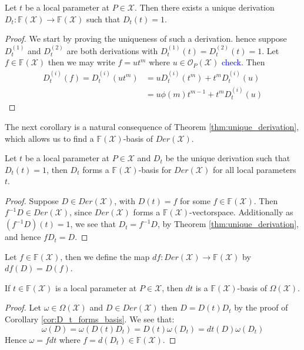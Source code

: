 \begin{theorem}\label{thm:unique_derivation}
  Let $t$ be a local parameter at $P \in \mathcal{X}$. Then there exists a unique derivation $D_t: \mathbb{F}(\mathcal{X}) \to \mathbb{F}(\mathcal{X})$ such that $D_t(t) = 1$.
\end{theorem}
\begin{proof}
  We start by proving the uniqueness of such a derivation. hence suppose $D_t^{(1)}$ and $D_t^{(2)}$ are both  derivations with $D_t^{(1)}(t) = D_t^{(2)}(t) = 1$. Let $f \in \mathbb{F}(\mathcal{X})$ then we may write $f = u t^m$ where $u \in \mathcal{O}_{P}(\mathcal{X})$ \textcolor{blue}{check}. Then
  \begin{align*}
    D_t^{(i)}(f) = D_t^{(i)}(u t^{m}) &= uD^{(i)}_t(t^m) + t^m D_t^{(i)}(u) \\
    &= u \phi(m) t^{m - 1} + t^m D_t^{(i)}(u)
  \end{align*}
\end{proof}

The next corollary is a natural consequence of Theorem \ref{thm:unique_derivation}, which allows us to find a $\mathbb{F}(\mathcal{X})$-basis of $Der(\mathcal{X})$.
\begin{corollary}\label{cor:D_t_forms_basis}
  Let $t$ be a local parameter at $P \in \mathcal{X}$ and $D_t$ be the unique derivation such that $D_t(t) = 1$, then $D_t$ forms a $\mathbb{F}(\mathcal{X})$-basis for $Der(\mathcal{X})$ for all local parameters $t$.
\end{corollary}
\begin{proof}
  Suppose $D \in Der(\mathcal{X})$, with $D(t) = f$ for some $f \in \mathbb{F}(\mathcal{X})$. Then $f^{-1} D \in Der(\mathcal{X})$, since $Der(\mathcal{X})$ forms a $\mathbb{F}(\mathcal{X})$-vectorspace. Additionally as $(f^{-1}D)(t) = 1$, we see that $D_t = f^{-1}D$, by Theorem \ref{thm:unique_derivation}, and hence $fD_t = D$.
\end{proof}

Let $f \in \mathbb{F}(\mathcal{X})$, then we define the map $df: Der(\mathcal{X}) \to \mathbb{F}(\mathcal{X})$ by $df(D) = D(f)$.

\begin{theorem}
If $t \in \mathbb{F}(\mathcal{X})$ is a local parameter at $P \in \mathcal{X}$, then $dt$ is a $\mathbb{F}(\mathcal{X})$-basis of $\Omega(\mathcal{X})$.
\end{theorem}
\begin{proof}
  Let $\omega \in \Omega(\mathcal{X})$ and $D \in Der(\mathcal{X})$ then $D = D(t)D_{t}$ by the proof of Corollary \ref{cor:D_t_forms_basis}. We see that:
  \begin{equation*}
    \omega (D) = \omega(D(t)D_t) = D(t) \omega(D_t) = dt(D) \omega(D_t)
  \end{equation*}
  Hence $\omega = fdt$ where $f = d(D_t) \in \mathbb{F}(\mathcal{X})$.
\end{proof}


